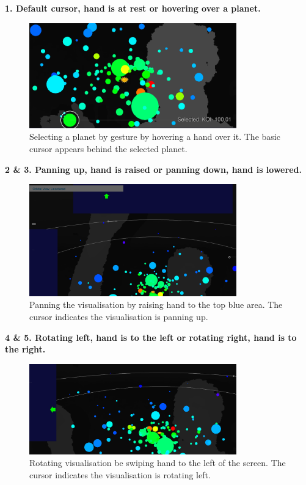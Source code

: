  {\bf 1. Default cursor, hand is at rest or hovering over a planet.}
\begin{figure}[H]
  \centering
      \includegraphics[width=0.8\textwidth]{images/select.PNG}
  \caption[Selecting a planet by gesture]{Selecting a planet by gesture by
hovering a hand over it. The basic cursor appears behind the selected planet.}
  \label{fig:left}
\end{figure}
\clearpage
 {\bf 2 \& 3. Panning up, hand is raised or panning down, hand is lowered.}
 \begin{figure}[H]
  \centering
      \includegraphics[width=0.8\textwidth]{images/up.PNG}
  \caption[Panning the visualisation by raising hand]{Panning the visualisation
by raising hand to the top blue area. The cursor indicates the visualisation is
panning up.}
  \label{fig:up}
\end{figure}
  {\bf 4 \& 5. Rotating left, hand is to the left or rotating right, hand is to
the right.}
\begin{figure}[H]
  \centering
      \includegraphics[width=0.8\textwidth]{images/left.PNG}
  \caption[Rotating visualisation be swiping hand]{Rotating visualisation be
swiping hand to the left of the screen. The cursor indicates the visualisation
is rotating left.}
  \label{fig:left}
\end{figure}
